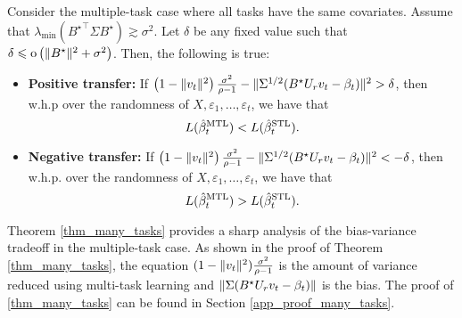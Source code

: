 \begin{theorem}\label{thm_many_tasks}
	Consider the multiple-task case where all tasks have the same covariates.
	Assume that $\lambda_{\min}({B^{\star}}^\top\Sigma B^{\star})\gtrsim \sigma^2$.
	Let $\delta$ be any fixed value such that $\delta \leqslant \operatorname{o} \left( \|B^\star\|^2 + \sigma^2\right)$.
	Then, the following is true:
	\begin{itemize}
		\item \textbf{Positive transfer:} If $\left(1 - \|v_t\|^2 \right)\frac{\sigma^2}{\rho - 1} - \|\Sigma^{1/2} (B^{\star} U_r v_t - \beta_t)\|^2 > \delta$, then w.h.p over the randomness of $X, \varepsilon_1, \dots, \varepsilon_t$, we have that
		 \[ L(\hat{\beta}_t^{\textup{MTL}}) < L(\hat{\beta}_t^{\textup{STL}}). \]
		\item \textbf{Negative transfer:} If $\left(1 - \|v_t\|^2\right)\frac{\sigma^2}{\rho - 1} - \|\Sigma^{1/2}(B^{\star} U_r v_t - \beta_t)\|^2 < -\delta$, then w.h.p. over the randomness of $X, \varepsilon_1, \dots, \varepsilon_t$, we have that
		\[ L(\hat{\beta}_t^{\textup{MTL}}) > L(\hat{\beta}_t^{\textup{STL}}). \]
	\end{itemize}
\end{theorem}
Theorem \ref{thm_many_tasks} provides a sharp analysis of the bias-variance tradeoff in the multiple-task case.
As shown in the proof of Theorem \ref{thm_many_tasks}, the equation $(1 - \|v_t\|^2)\frac {\sigma^2}{\rho - 1}$ is the amount of variance reduced using multi-task learning and $\|\Sigma (B^{\star} U_r v_t - \beta_t)\|$ is the bias.
The proof of \ref{thm_many_tasks} can be found in Section \ref{app_proof_many_tasks}.





